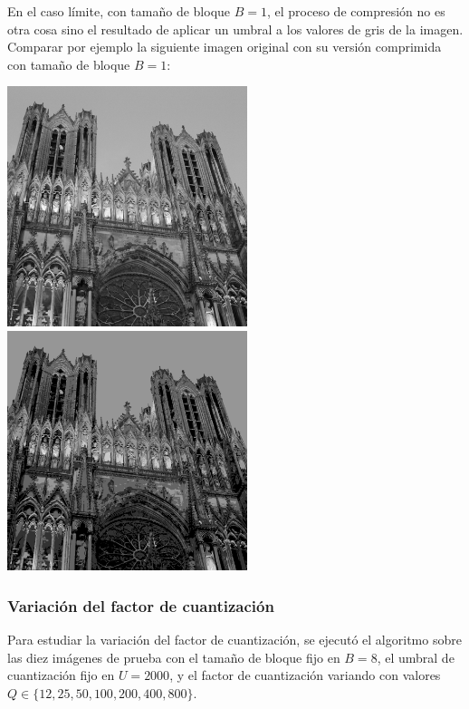 \documentclass{article}
\newcommand{\set}[1]{\{#1\}}
\begin{document}
\bigskip
En el caso límite, con tamaño de bloque $B = 1$, el proceso de
compresión no es otra cosa sino el resultado de aplicar un umbral
a los valores de gris de la imagen.
Comparar por ejemplo la siguiente imagen original con su versión
comprimida con tamaño de bloque $B = 1$:
\begin{center}
\includegraphics[width=7cm]{../imgs/input/imgs_gray/img04.png}
\includegraphics[width=7cm]{../imgs/output/gray_1_50_2000/img04.png}
\end{center}

\subsubsection{Variación del factor de cuantización}
\label{sec:variacion_factor_cuantizacion}

Para estudiar la variación del factor de cuantización, se ejecutó el
algoritmo sobre las diez imágenes de prueba con el
tamaño de bloque fijo en $B = 8$,
el umbral de cuantización fijo en $U = 2000$,
y el factor de cuantización variando con valores
$Q \in \set{12,25,50,100,200,400,800}$.
\end{document}
